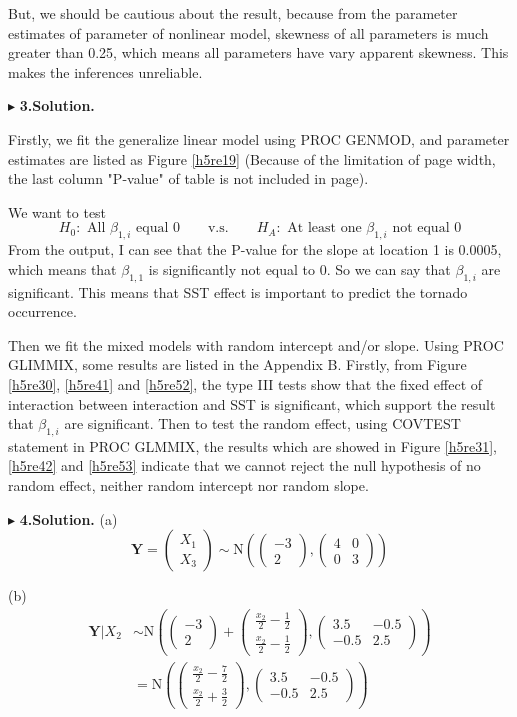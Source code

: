 \documentclass[letterpaper, 12pt]{article}
\newcommand{\ba}{$$\begin{aligned}}
\newcommand{\ea}{\end{aligned}$$}
\newcommand{\lma}{\left(\begin{matrix}}
\newcommand{\rma}{\end{matrix}\right)}
\begin{document}
But, we should be cautious about the result, because from the parameter estimates of parameter of nonlinear model, skewness of all parameters is much greater than 0.25, which means all parameters have vary apparent skewness. This makes the inferences unreliable.


$\blacktriangleright$ \textbf{3.\quad Solution.} 

Firstly, we fit the generalize linear model using PROC GENMOD, and parameter estimates are listed as Figure \ref{h5re19} (Because of the limitation of page width, the last column "P-value" of table is not included in page).

We want to test
$$
H_0: \text{ All $\beta_{1,i}$ equal 0}\qquad\text{v.s.}\qquad H_A: \text{ At least one $\beta_{1,i}$ not equal 0}
$$
From the output, I can see that the P-value for the slope at location 1 is 0.0005, which means that $\beta_{1,1}$ is significantly not equal to 0. So we can say that $\beta_{1,i}$ are significant. This means that SST effect is important to predict the tornado occurrence. 

    Then we fit the mixed models with random intercept and/or slope. Using PROC GLIMMIX, some results are listed in the Appendix B. Firstly, from Figure \ref{h5re30}, \ref{h5re41} and \ref{h5re52}, the type III tests show that the fixed effect of interaction between interaction and SST is significant, which support the result that $\beta_{1,i}$ are significant. Then to test the random effect, using COVTEST statement in PROC GLMMIX, the results which are showed in Figure \ref{h5re31}, \ref{h5re42} and \ref{h5re53} indicate that we cannot reject the null hypothesis of no random effect, neither random intercept nor random slope. 





$\blacktriangleright$ \textbf{4.\quad Solution.} 
(a) 
$$
\bm{Y}=\lma X_1\\X_3\rma\sim \text{N}\left(\lma -3 \\2\rma,\lma 4&0\\0&3\rma\right)
$$

(b)
\ba
\bm{Y}|X_2&\sim\text{N}\left(\lma -3\\2\rma+\lma \frac{x_2}{2}-\frac12\\\frac{x_2}2-\frac12\rma,\lma 3.5 &-0.5\\-0.5 &2.5\rma\right)\\
&=\text{N}\left(\lma \frac{x_2}{2}-\frac72\\\frac{x_2}2+\frac32\rma,\lma 3.5 &-0.5\\-0.5 &2.5\rma\right)
\ea
\end{document}
